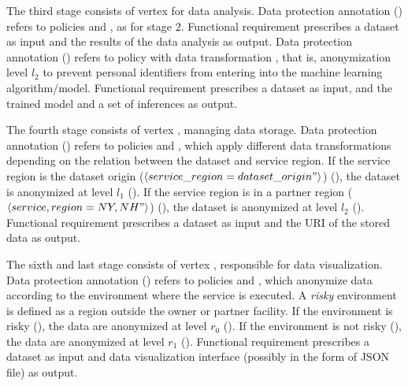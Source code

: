The third stage consists of vertex   for data analysis.
Data protection annotation \myLambda() refers to policies  and , as for stage 2.
Functional requirement  prescribes a dataset as input and the results of the data analysis as output.
Data protection annotation \myLambda() refers to policy  with data transformation , that is, anonymization level $l_2$ to prevent personal identifiers from entering into the machine learning algorithm/model.
Functional requirement  prescribes a dataset as input, and the trained model and a set of inferences as output.

The fourth stage consists of vertex , managing data storage. Data protection annotation \myLambda() refers to policies  and ,
which apply different data transformations depending on the relation between the dataset and service region.
If the service region is the dataset origin ($\langle service\_region=dataset\_origin"\rangle$) (), the dataset is anonymized at level $l_1$ ().
If the service region is in a partner region ($\langle service,region={NY,NH}"\rangle$) (), the dataset is anonymized at level $l_2$ ().
Functional requirement  prescribes a dataset as input and the URI of the stored data as output.

The sixth and last stage consists of vertex , responsible for data visualization.
Data protection annotation \myLambda() refers to policies  and , which anonymize data according to the environment where the service is executed.
A \emph{risky} environment is defined as a region outside the owner or partner facility.
If the environment is risky (), the data are anonymized at level $r_0$ ().
If the environment is not risky (), the data are anonymized at level $r_1$ ().
Functional requirement  prescribes a dataset as input and data visualization interface (possibly in the form of JSON file) as output.

